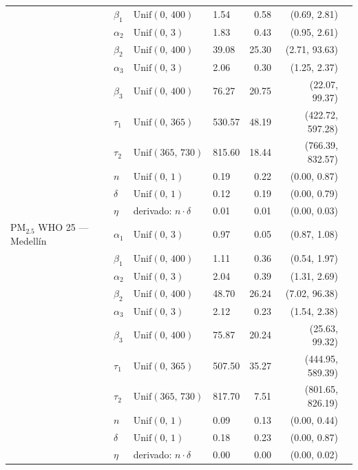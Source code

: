 \begin{longtable}{llllrrr}
 & $\beta_{1}$ & $\text{Unif}(0,\,400)$ & 1.54 & 0.58 & (0.69, 2.81) \\
 & $\alpha_{2}$ & $\text{Unif}(0,\,3)$ & 1.83 & 0.43 & (0.95, 2.61) \\
 & $\beta_{2}$ & $\text{Unif}(0,\,400)$ & 39.08 & 25.30 & (2.71, 93.63) \\
 & $\alpha_{3}$ & $\text{Unif}(0,\,3)$ & 2.06 & 0.30 & (1.25, 2.37) \\
 & $\beta_{3}$ & $\text{Unif}(0,\,400)$ & 76.27 & 20.75 & (22.07, 99.37) \\
 & $\tau_{1}$ & $\text{Unif}(0,\,365)$ & 530.57 & 48.19 & (422.72, 597.28) \\
 & $\tau_{2}$ & $\text{Unif}(365,\,730)$ & 815.60 & 18.44 & (766.39, 832.57) \\
 & $n$ & $\text{Unif}(0,\,1)$ & 0.19 & 0.22 & (0.00, 0.87) \\
 & $\delta$ & $\text{Unif}(0,\,1)$ & 0.12 & 0.19 & (0.00, 0.79) \\
 & $\eta$ & derivado: $n \cdot \delta$ & 0.01 & 0.01 & (0.00, 0.03) \\
\midrule
PM$_{2.5}$ WHO 25 --- Medell\'{i}n & $\alpha_{1}$ & $\text{Unif}(0,\,3)$ & 0.97 & 0.05 & (0.87, 1.08) \\
 & $\beta_{1}$ & $\text{Unif}(0,\,400)$ & 1.11 & 0.36 & (0.54, 1.97) \\
 & $\alpha_{2}$ & $\text{Unif}(0,\,3)$ & 2.04 & 0.39 & (1.31, 2.69) \\
 & $\beta_{2}$ & $\text{Unif}(0,\,400)$ & 48.70 & 26.24 & (7.02, 96.38) \\
 & $\alpha_{3}$ & $\text{Unif}(0,\,3)$ & 2.12 & 0.23 & (1.54, 2.38) \\
 & $\beta_{3}$ & $\text{Unif}(0,\,400)$ & 75.87 & 20.24 & (25.63, 99.32) \\
 & $\tau_{1}$ & $\text{Unif}(0,\,365)$ & 507.50 & 35.27 & (444.95, 589.39) \\
 & $\tau_{2}$ & $\text{Unif}(365,\,730)$ & 817.70 & 7.51 & (801.65, 826.19) \\
 & $n$ & $\text{Unif}(0,\,1)$ & 0.09 & 0.13 & (0.00, 0.44) \\
 & $\delta$ & $\text{Unif}(0,\,1)$ & 0.18 & 0.23 & (0.00, 0.87) \\
 & $\eta$ & derivado: $n \cdot \delta$ & 0.00 & 0.00 & (0.00, 0.02) \\
\end{longtable}
